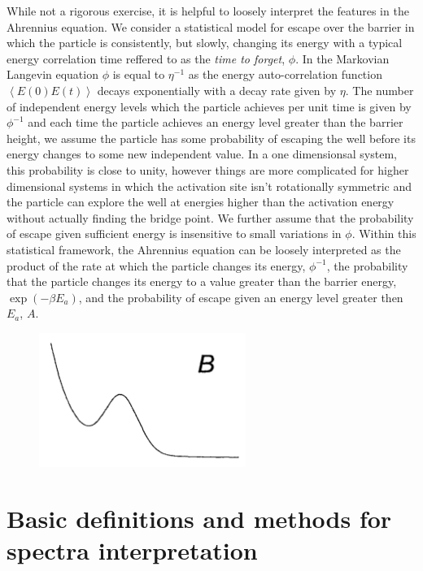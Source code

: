 \documentclass{article}
\begin{document}
While not a rigorous exercise, it is helpful to loosely interpret the features in the Ahrennius equation. We consider a statistical model for escape over the barrier in which the particle is consistently, but slowly, changing its energy with a typical energy correlation time reffered to as the \emph{time to forget}, $\phi$. In the Markovian Langevin equation $\phi$ is equal to $\eta^{-1}$ as the energy auto-correlation function $\left<E(0)E(t)\right>$ decays exponentially with a decay rate given by $\eta$.  The number of independent energy levels which the particle achieves per unit time is given by $\phi^{-1}$ and each time the particle achieves an energy level greater than the barrier height, we assume the particle has some probability of escaping the well before its energy changes to some new independent value. In a one dimensionsal system, this probability is close to unity, however things are more complicated for higher dimensional systems in which the activation site isn't rotationally symmetric and the particle can explore the well at energies higher than the activation energy without actually finding the bridge point. We further assume that the probability of escape given sufficient energy is insensitive to small variations in $\phi$. Within this statistical framework, the Ahrennius equation can be loosely interpreted as the product of the rate at which the particle changes its energy, $\phi^{-1}$, the probability that the particle changes its energy to a value greater than the barrier energy, $\exp(-\beta E_a)$, and the probability of escape given an energy level greater then $E_a$, $A$. 

\begin{figure}
	\centering
	\includegraphics[width=0.6\textwidth]{kramers_potential}
	\caption{}
	\label{fig:kramers_potential}
\end{figure}

\section{Basic definitions and methods for spectra interpretation}
\end{document}
